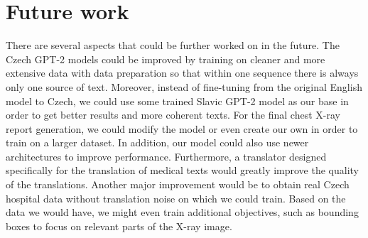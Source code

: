 \section*{Future work}
There are several aspects that could be further worked on in the future. The Czech GPT-2 models could be improved by training on cleaner and more extensive data with data preparation so that within one sequence there is always only one source of text. Moreover, instead of fine-tuning from the original English model to Czech, we could use some trained Slavic GPT-2 model as our base in order to get better results and more coherent texts.
For the final chest X-ray report generation, we could modify the model or even create our own in order to train on a larger dataset. In addition, our model could also use newer architectures to improve performance. Furthermore, a translator designed specifically for the translation of medical texts would greatly improve the quality of the translations. Another major improvement would be to obtain real Czech hospital data without translation noise on which we could train. Based on the data we would have, we might even train additional objectives, such as bounding boxes to focus on relevant parts of the X-ray image.